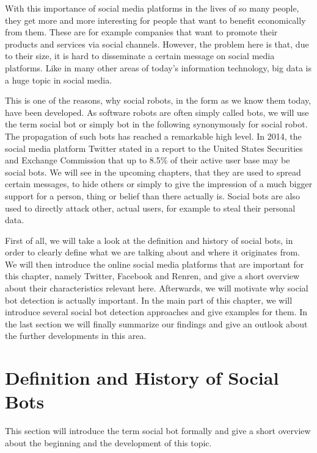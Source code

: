 With this importance of social media platforms in the lives of so many people, they get more and more interesting for people that want to benefit economically from them. These are for example companies that want to promote their products and services via social channels. However, the problem here is that, due to their size, it is hard to disseminate a certain message on social media platforms. Like in many other areas of today's  information technology, big data is a huge topic in social media.

This is one of the reasons, why social robots, in the form as we know them today, have been developed. As software robots are often simply called bots, we will use the term social bot or simply bot in the following synonymously for social robot. The propagation of such bots has reached a remarkable high level. In 2014, the social media platform Twitter stated in a report to the United States Securities and Exchange Commission that up to 8.5\% of their active user base may be social bots\cite{twitterbot}.  We will see in the upcoming chapters, that they are used to spread certain messages, to hide others or simply to give the impression of a much bigger support for a person, thing or belief than there actually is. Social bots are also used to directly attack other, actual users, for example to steal their personal data.

First of all, we will take a look at the definition and history of social bots, in order to clearly define what we are talking about and where it originates from. We will then introduce the online social media platforms that are important for this chapter, namely Twitter, Facebook and Renren, and give a short overview about their characteristics relevant here. Afterwards, we will motivate why social bot detection is actually important. In the main part of this chapter, we will introduce several social bot detection approaches and give examples for them. In the last section we will finally summarize our findings and give an outlook about the further developments in this area.


\section{Definition and History of Social Bots} 
This section will introduce the term social bot formally and give a short overview about the beginning and the development of this topic.

